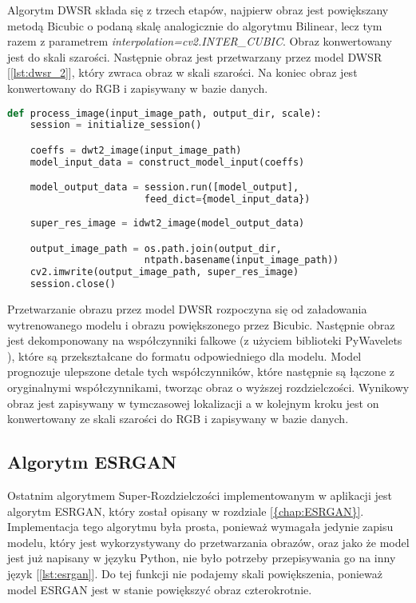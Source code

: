 Algorytm DWSR składa się z trzech etapów, najpierw obraz jest powiększany metodą Bicubic o podaną skalę analogicznie do algorytmu Bilinear, lecz tym razem z parametrem \textit{interpolation=cv2.INTER\_CUBIC}. Obraz konwertowany jest do skali szarości. Następnie obraz jest przetwarzany przez model DWSR [\ref{lst:dwsr_2}], który zwraca obraz w skali szarości. Na koniec obraz jest konwertowany do RGB i zapisywany w bazie danych.


\begin{lstlisting}[language=Python, caption=Przetwarzanie przez model DWSR., label={lst:dwsr_2}]    
def process_image(input_image_path, output_dir, scale):
    session = initialize_session()

    coeffs = dwt2_image(input_image_path)
    model_input_data = construct_model_input(coeffs)

    model_output_data = session.run([model_output], 
                        feed_dict={model_input_data})
    
    super_res_image = idwt2_image(model_output_data)

    output_image_path = os.path.join(output_dir, 
                        ntpath.basename(input_image_path))
    cv2.imwrite(output_image_path, super_res_image)        
    session.close()

\end{lstlisting}

Przetwarzanie obrazu przez model DWSR rozpoczyna się od załadowania wytrenowanego modelu i obrazu powiększonego przez Bicubic. Następnie obraz jest dekomponowany na współczynniki falkowe (z użyciem biblioteki PyWavelets \cite{pywavelets}), które są przekształcane do formatu odpowiedniego dla modelu. Model prognozuje ulepszone detale tych współczynników, które następnie są łączone z oryginalnymi współczynnikami, tworząc obraz o wyższej rozdzielczości. Wynikowy obraz jest zapisywany w tymczasowej lokalizacji a w kolejnym kroku jest on konwertowany ze skali szarości do RGB i zapisywany w bazie danych.


\subsection*{Algorytm ESRGAN}

Ostatnim algorytmem Super-Rozdzielczości implementowanym w aplikacji jest algorytm ESRGAN, który został opisany w rozdziale \ref{{chap:ESRGAN}}.
Implementacja tego algorytmu była prosta, ponieważ wymagała jedynie zapisu modelu, który jest wykorzystywany do przetwarzania obrazów, oraz jako że model jest już napisany w języku Python, nie było potrzeby przepisywania go na inny język [\ref{lst:esrgan}]. Do tej funkcji nie podajemy skali powiększenia, ponieważ model ESRGAN jest w stanie powiększyć obraz czterokrotnie.

